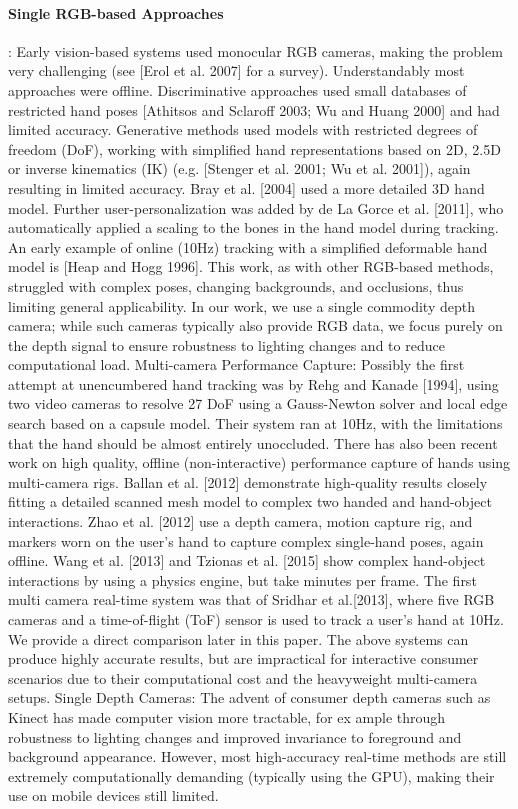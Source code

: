 \begin{DRAFT}
\paragraph{Single RGB-based Approaches}:
Early vision-based systems used monocular RGB cameras, making the problem very challenging (see [Erol et al. 2007] for a survey). Understandably most approaches were offline. Discriminative approaches used small databases of restricted hand poses [Athitsos and Sclaroff 2003; Wu and Huang 2000] and had limited accuracy. Generative methods used models with restricted degrees of freedom (DoF), working with simplified hand representations based on 2D, 2.5D or inverse kinematics (IK) (e.g. [Stenger et al. 2001; Wu et al. 2001]), again resulting in limited accuracy. Bray et al. [2004] used a more detailed 3D hand model. Further user-personalization was added by de La Gorce et al. [2011], who automatically applied a scaling to the bones in the hand model during tracking. An early example of online (10Hz) tracking with a simplified deformable hand model is [Heap and Hogg 1996]. This work, as with other RGB-based methods, struggled with complex poses, changing backgrounds, and occlusions, thus limiting general applicability. In our work, we use a single commodity depth camera; while such cameras typically also provide RGB data, we focus purely on the depth signal to ensure robustness to lighting changes and to reduce computational load. Multi-camera Performance Capture: Possibly the first attempt at unencumbered hand tracking was by Rehg and Kanade [1994], using two video cameras to resolve 27 DoF using a Gauss-Newton solver and local edge search based on a capsule model. Their system ran at 10Hz, with the limitations that the hand should be almost entirely unoccluded. There has also been recent work on high quality, offline (non-interactive) performance capture of hands using multi-camera rigs. Ballan et al. [2012] demonstrate high-quality results closely fitting a detailed scanned mesh model to complex two handed and hand-object interactions. Zhao et al. [2012] use a depth camera, motion capture rig, and markers worn on the user’s hand to capture complex single-hand poses, again offline. Wang et al. [2013] and Tzionas et al. [2015] show complex hand-object interactions by using a physics engine, but take minutes per frame. The first multi camera real-time system was that of Sridhar et al.[2013], where five RGB cameras and a time-of-flight (ToF) sensor is used to track a user’s hand at 10Hz. We provide a direct comparison later in this paper. The above systems can produce highly accurate results, but are impractical for interactive consumer scenarios due to their computational cost and the heavyweight multi-camera setups. Single Depth Cameras: The advent of consumer depth cameras such as Kinect has made computer vision more tractable, for ex ample through robustness to lighting changes and improved invariance to foreground and background appearance. However, most high-accuracy real-time methods are still extremely computationally demanding (typically using the GPU), making their use on mobile devices still limited.


\end{DRAFT}
